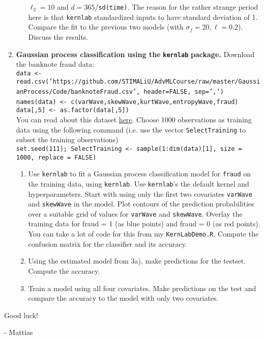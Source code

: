 \documentclass[11pt,english]{article}\usepackage[]{graphicx}\usepackage[]{color}
\begin{document}
\begin{enumerate}
\begin{enumerate}
$\ell_{2}=10$ and $d=365/$\texttt{sd(time)}. The reason for the
rather strange period here is that \texttt{kernlab} standardized inputs
to have standard deviation of 1. Compare the fit to the previous two
models (with $\sigma_{f}=20,\ell=0.2$). Discuss the results.
\end{enumerate}
\item \textbf{Gaussian process classification using the }\texttt{\textbf{kernlab}}\textbf{
package. }Download the banknote fraud data:\textbf{ }\\
\texttt{\scriptsize{}data <- read.csv('https://github.com/STIMALiU/AdvMLCourse/raw/master/GaussianProcess/Code/banknoteFraud.csv',
header=FALSE, sep=',')}~\\
\texttt{\scriptsize{}names(data) <- c(\textquotedbl{}varWave\textquotedbl{},\textquotedbl{}skewWave\textquotedbl{},\textquotedbl{}kurtWave\textquotedbl{},\textquotedbl{}entropyWave\textquotedbl{},\textquotedbl{}fraud\textquotedbl{})
}~\\
\texttt{\scriptsize{}data{[},5{]} <- as.factor(data{[},5{]})}\textbf{}\\
You can read about this dataset \href{http://archive.ics.uci.edu/ml/datasets/banknote+authentication}{here}.
Choose 1000 observations as training data using the following command
(i.e. use the vector \texttt{SelectTraining} to subset the training
observations)\texttt{\scriptsize{}}~\\
\texttt{\scriptsize{}set.seed(111); SelectTraining <- sample(1:dim(data){[}1{]},
size = 1000, replace = FALSE)}{\scriptsize \par}
\begin{enumerate}
\item Use \texttt{kernlab} to fit a Gaussian process classification model
for \texttt{fraud}\textbf{ }on the training data, using \texttt{kernlab}.
Use \texttt{kernlab}'s the default kernel and hyperparameters. Start
with using only the first two covariates \texttt{varWave} and \texttt{skewWave}
in the model. Plot contours of the prediction probabilities over a
suitable grid of values for \texttt{varWave} and \texttt{skewWave}.
Overlay the training data for fraud = 1 (as blue points) and fraud
= 0 (as red points). You can take a lot of code for this from my \texttt{KernLabDemo.R}.
Compute the confusion matrix for the classifier and its accuracy.
\item Using the estimated model from 3a), make predictions for the testset.
Compute the accuracy.
\item Train a model using all four covariates. Make predictions on the test
and compare the accuracy to the model with only two covariates.
\end{enumerate}
\end{enumerate}
\bigskip{}
Good luck!

\bigskip{}
- Mattias
\end{document}
